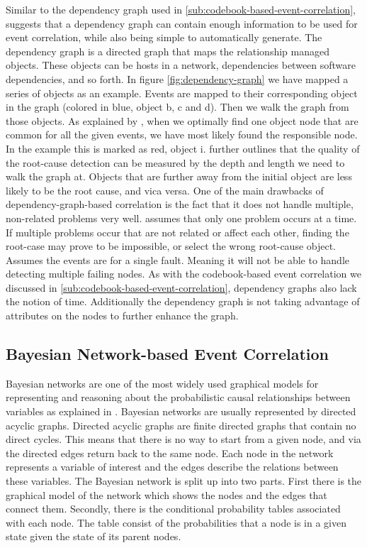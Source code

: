 Similar to the dependency graph used in \ref{sub:codebook-based-event-correlation}, \textcite{Gruschke_1998} suggests that a dependency graph can contain enough information to be used for event correlation, while also being simple to automatically generate. The dependency graph is a directed graph that maps the relationship managed objects. These objects can be hosts in a network, dependencies between software dependencies, and so forth.
In figure \ref{fig:dependency-graph} we have mapped a series of objects as an example. Events are mapped to their corresponding object in the graph (colored in blue, object b, c and d). Then we walk the graph from those objects. As explained by \textcite{Gruschke_1998}, when we optimally find one object node that are common for all the given events, we have most likely found the responsible node. In the example this is marked as red, object i.
\textcite{Gruschke_1998} further outlines that the quality of the root-cause detection can be measured by the depth and length we need to walk the graph at. Objects that are further away from the initial object are less likely to be the root cause, and vica versa.
One of the main drawbacks of dependency-graph-based correlation is the fact that it does not handle multiple, non-related problems very well. \textcite{Gruschke_1998} assumes that only one problem occurs at a time. If multiple problems occur that are not related or affect each other, finding the root-case may prove to be impossible, or select the wrong root-cause object.
Assumes the events are for a single fault. Meaning it will not be able to handle detecting multiple failing nodes.
As with the codebook-based event correlation we discussed in \ref{sub:codebook-based-event-correlation}, dependency graphs also lack the notion of time. Additionally the dependency graph is not taking advantage of attributes on the nodes to further enhance the graph.

\subsection{Bayesian Network-based Event Correlation}

Bayesian networks are one of the most widely used graphical models for representing and reasoning about the probabilistic causal relationships between variables as explained in \textcite{Kavousi_2014}. Bayesian networks are usually represented by directed acyclic graphs. Directed acyclic graphs are finite directed graphs that contain no direct cycles. This means that there is no way to start from a given node, and via the directed edges return back to the same node. Each node in the network represents a variable of interest and the edges describe the relations between these variables.
The Bayesian network is split up into two parts. First there is the graphical model of the network which shows the nodes and the edges that connect them. Secondly, there is the conditional probability tables associated with each node. The table consist of the probabilities that a node is in a given state given the state of its parent nodes.



